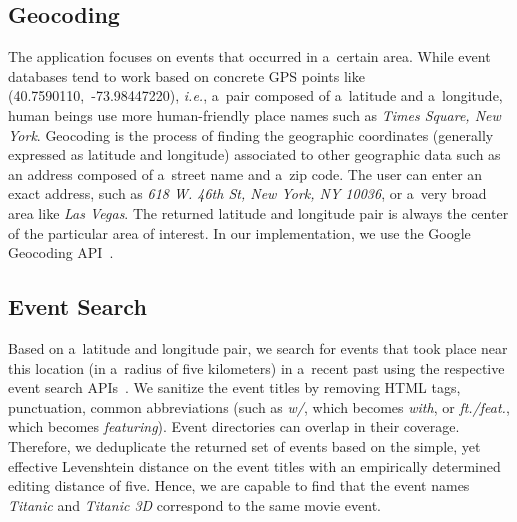 \documentclass[runningheads,a4paper]{llncs}
\begin{document}
{\subsection{Geocoding}
The application focuses on events that occurred in a~certain area. While event databases tend to work based on concrete GPS points like
\mbox{(40.7590110, -73.98447220)}, \emph{i.e.}, a~pair composed of a~latitude and a~longitude, human beings use more human-friendly place names such as \emph{Times Square, New York}. Geocoding is the process of finding the geographic coordinates (generally expressed as latitude and longitude) associated to other geographic data such as an address composed of a~street name and a~zip code. The user can enter an exact address, such as \emph{618 W. 46th St, New York, NY 10036}, or a~very broad area like \emph{Las Vegas}. The returned latitude and longitude pair is always the center of the particular area of interest. In our implementation, we use the Google Geocoding API~\cite{Geocoding2012}.

\subsection{Event Search}
Based on a~latitude and longitude pair, we search for events that took place near this location (in a~radius of five kilometers) in a~recent past using the respective event search APIs~\cite{Eventful2012,Foursquare2012,GooglePlaces2012,Upcoming2012}. We sanitize the event titles by removing HTML tags, punctuation,
common abbreviations (such as \emph{w/}, which becomes \emph{with}, or \emph{ft./feat.}, which becomes \emph{featuring}). Event directories can overlap in their coverage. Therefore, we deduplicate the returned set of events based on the simple, yet effective Levenshtein distance on the event titles with an empirically determined editing distance of five. Hence, we are capable to find that the event names \emph{Titanic} and \emph{Titanic 3D} correspond to the same movie event.

}
\end{document}
